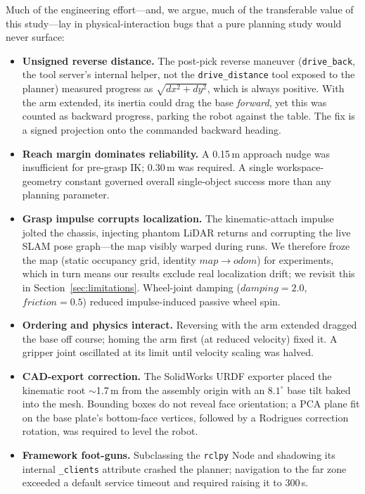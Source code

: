 \documentclass[conference]{IEEEtran}
\begin{document}
Much of the engineering effort---and, we argue, much of the transferable
value of this study---lay in physical-interaction bugs that a pure
planning study would never surface:

\begin{itemize}
\item \textbf{Unsigned reverse distance.} The post-pick reverse maneuver
  (\texttt{drive\_back}, the tool server's internal helper, not the
  \texttt{drive\_distance} tool exposed to the planner)
measured progress as $\sqrt{dx^2 + dy^2}$, which is always positive. With
the arm extended, its inertia could drag the base \emph{forward}, yet this
was counted as backward progress, parking the robot against the table. The
fix is a signed projection onto the commanded backward heading.
\item \textbf{Reach margin dominates reliability.} A 0.15\,m approach
nudge was insufficient for pre-grasp IK; 0.30\,m was required. A single
workspace-geometry constant governed overall single-object success more
than any planning parameter.
\item \textbf{Grasp impulse corrupts localization.} The kinematic-attach
impulse jolted the chassis, injecting phantom LiDAR returns and corrupting
the live SLAM pose graph---the map visibly warped during runs. We
therefore froze the map (static occupancy grid, identity
$map \rightarrow odom$) for experiments, which in turn means our results
exclude real localization drift; we revisit this in
Section~\ref{sec:limitations}. Wheel-joint damping ($damping = 2.0$,
$friction = 0.5$) reduced impulse-induced passive wheel spin.
\item \textbf{Ordering and physics interact.} Reversing with the arm
extended dragged the base off course; homing the arm first (at reduced
velocity) fixed it. A gripper joint oscillated at its limit until velocity
scaling was halved.
\item \textbf{CAD-export correction.} The SolidWorks URDF exporter placed
the kinematic root $\sim$1.7\,m from the assembly origin with an
$8.1^{\circ}$ base tilt baked into the mesh. Bounding boxes do not reveal
face orientation; a PCA plane fit on the base plate's bottom-face
vertices, followed by a Rodrigues correction rotation, was required to
level the robot.
\item \textbf{Framework foot-guns.} Subclassing the \texttt{rclpy} Node
and shadowing its internal \texttt{\_clients} attribute crashed the
planner; navigation to the far zone exceeded a default service timeout and
required raising it to 300\,s.
\end{itemize}
\end{document}
